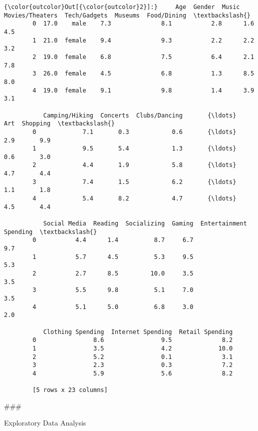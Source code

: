 \documentclass[11pt]{article}
\begin{document}
\begin{Verbatim}[commandchars=\\\{\}]
{\color{outcolor}Out[{\color{outcolor}2}]:}     Age  Gender  Music  Movies/Theaters  Tech/Gadgets  Museums  Food/Dining  \textbackslash{}
        0  17.0    male    7.3              8.1           2.8      1.6          4.5   
        1  21.0  female    9.4              9.3           2.2      2.2          3.2   
        2  19.0  female    6.8              7.5           6.4      2.1          7.8   
        3  26.0  female    4.5              6.8           1.3      8.5          8.0   
        4  19.0  female    9.1              9.8           1.4      3.9          3.1   
        
           Camping/Hiking  Concerts  Clubs/Dancing       {\ldots}         Art  Shopping  \textbackslash{}
        0             7.1       0.3            0.6       {\ldots}         2.9       9.9   
        1             9.5       5.4            1.3       {\ldots}         0.6       3.0   
        2             4.4       1.9            5.8       {\ldots}         4.7       4.4   
        3             7.4       1.5            6.2       {\ldots}         1.1       1.8   
        4             5.4       8.2            4.7       {\ldots}         4.5       4.4   
        
           Social Media  Reading  Socializing  Gaming  Entertainment Spending  \textbackslash{}
        0           4.4      1.4          8.7     6.7                     9.7   
        1           5.7      4.5          5.3     9.5                     5.3   
        2           2.7      8.5         10.0     3.5                     3.5   
        3           5.5      9.8          5.1     7.0                     3.5   
        4           5.1      5.0          6.8     3.0                     2.0   
        
           Clothing Spending  Internet Spending  Retail Spending  
        0                8.6                9.5              8.2  
        1                3.5                4.2             10.0  
        2                5.2                0.1              3.1  
        3                2.3                0.3              7.2  
        4                5.9                5.6              8.2  
        
        [5 rows x 23 columns]
\end{Verbatim}
            
    \#\#\#

Exploratory Data Analysis
\end{document}
